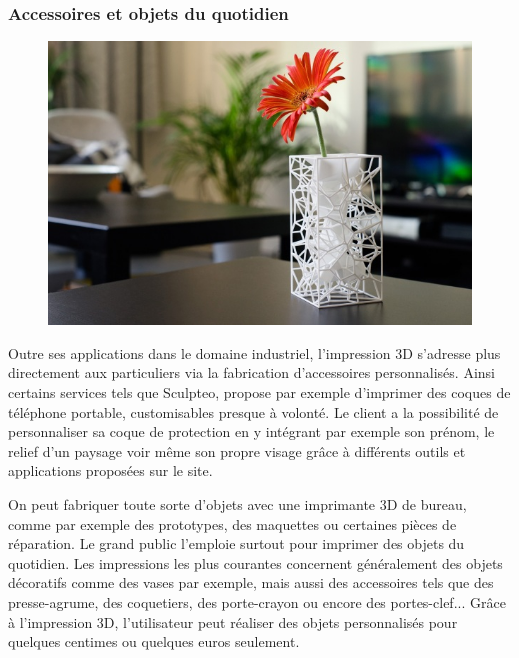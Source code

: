 \documentclass{article}
\begin{document}
\subsubsection{Accessoires et objets du quotidien}

\begin{figure}[h!]
\centering
\includegraphics[scale=0.4]{./images/vase-design.png}
\end{figure}\hfill 

Outre ses applications dans le domaine industriel, l'impression 3D s'adresse plus directement aux particuliers via la fabrication d'accessoires personnalisés. Ainsi certains services tels que Sculpteo, propose par exemple d'imprimer des coques de téléphone portable, customisables presque à volonté. Le client a la possibilité de personnaliser sa coque de protection en y intégrant par exemple son prénom, le relief d'un paysage voir même son propre visage grâce à différents outils et applications proposées sur le site.\hfill
 \par\leavevmode\par
On peut fabriquer toute sorte d'objets avec une imprimante 3D de bureau, comme par exemple des prototypes, des maquettes ou certaines pièces de réparation. Le grand public l'emploie surtout pour imprimer des objets du quotidien. Les impressions les plus courantes concernent généralement des objets décoratifs comme des vases par exemple, mais aussi des accessoires tels que des presse-agrume, des coquetiers, des porte-crayon ou encore des portes-clef... Grâce à l'impression 3D, l'utilisateur peut réaliser des objets personnalisés pour quelques centimes ou quelques euros seulement.
\end{document}
